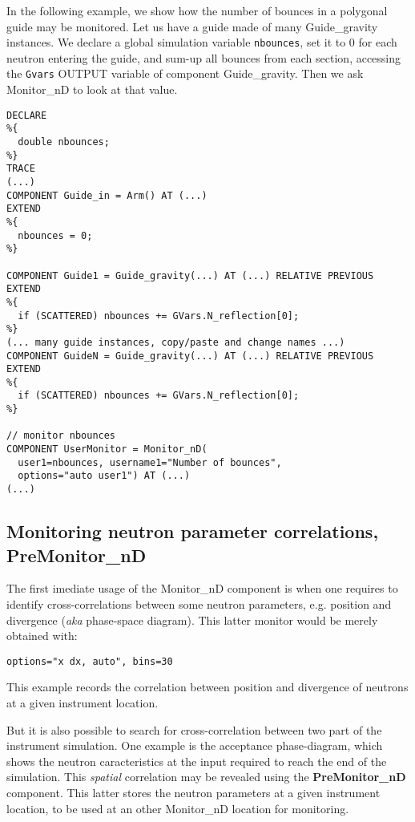 In the following example, we show how the number of bounces in a polygonal guide may be monitored. Let us have a guide made of many Guide\_gravity instances. We declare a global simulation variable \verb+nbounces+, set it to 0 for each neutron entering the guide, and sum-up all bounces from each section, accessing the \verb+Gvars+ OUTPUT variable of component Guide\_gravity. Then we ask Monitor\_nD to look at that value.
\begin{verbatim}
DECLARE
%{
  double nbounces;
%}
TRACE
(...)
COMPONENT Guide_in = Arm() AT (...)
EXTEND
%{
  nbounces = 0;
%}

COMPONENT Guide1 = Guide_gravity(...) AT (...) RELATIVE PREVIOUS
EXTEND
%{
  if (SCATTERED) nbounces += GVars.N_reflection[0];
%}
(... many guide instances, copy/paste and change names ...)
COMPONENT GuideN = Guide_gravity(...) AT (...) RELATIVE PREVIOUS
EXTEND
%{
  if (SCATTERED) nbounces += GVars.N_reflection[0];
%}

// monitor nbounces
COMPONENT UserMonitor = Monitor_nD(
  user1=nbounces, username1="Number of bounces",
  options="auto user1") AT (...)
(...)
\end{verbatim}

\subsection{Monitoring neutron parameter correlations, PreMonitor\_nD}

The first imediate usage of the Monitor\_nD component is when one requires to identify cross-correlations between some neutron parameters, e.g. position and divergence ({\it aka} phase-space diagram). This latter monitor would be merely obtained with:
\begin{verbatim}
options="x dx, auto", bins=30
\end{verbatim}
This example records the correlation between position and divergence of neutrons at a given instrument location.


But it is also possible to search for cross-correlation between two part of the instrument simulation. One example is the acceptance phase-diagram, which shows the neutron caracteristics at the input required to reach the end of the simulation. This \emph{spatial} correlation may be revealed using the {\bf PreMonitor\_nD} component. This latter stores the neutron parameters at a given instrument location, to be used at an other Monitor\_nD location for monitoring.

